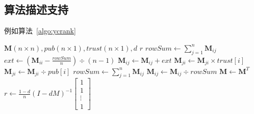 \subsection{算法描述支持}
例如算法~\ref{algo:ycrank}
\begin{algorithm}[htbp]
    \caption{YCRank}
    \begin{algorithmic}
        \REQUIRE $\mathbf{M}(n \times n),pub(n\times 1),trust(n\times 1),d$
        \ENSURE $r$
                \STATE $rowSum \gets \sum_{j=1}^{n}\mathbf{M}_{ij}$
                    \STATE $ext\gets (\mathbf{M}_{ii}-\frac{rowSum}{n})\div(n-1)$ 
                        \STATE $\mathbf{M}_{ij} \gets \mathbf{M}_{ij} + ext$
                    \ENDFOR
                \ENDIF
            \ENDFOR
                \STATE $\mathbf{M}_{ji} \gets \mathbf{M}_{ji} \times trust[i]$
            \ENDFOR
                \STATE $\mathbf{M}_{ji} \gets \mathbf{M}_{ji} \div pub[i]$
            \ENDFOR
                \STATE $rowSum \gets \sum_{j=1}^{n}\mathbf{M}_{ij}$
                    \STATE $\mathbf{M}_{ij} \gets \mathbf{M}_{ij}\div rowSum$
                \ENDFOR
            \ENDFOR
            \STATE $\mathbf{M} \gets \mathbf{M}^T$
            \STATE $r \gets \frac{1-d}{n}(I-dM)^{-1}\begin{bmatrix}1\\1\\\vdots\\1\end{bmatrix}$
    \end{algorithmic}
    \label{algo:ycrank}
\end{algorithm}